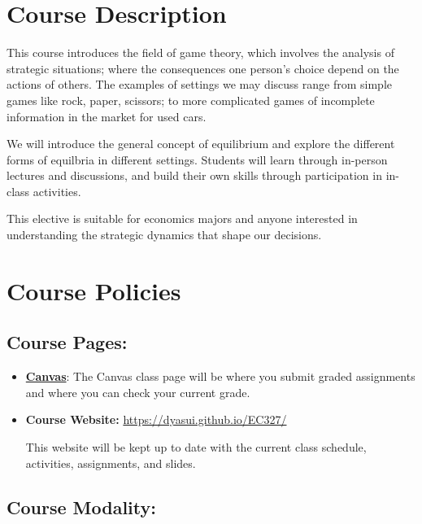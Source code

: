 \section*{Course Description}

This course introduces the field of game theory, which involves the analysis of strategic situations; where the consequences one person's choice depend on the actions of others.
The examples of settings we may discuss range from simple games like rock, paper, scissors; to more complicated games of incomplete information in the market for used cars. 

We will introduce the general concept of equilibrium and explore the different forms of equilbria in different settings.
Students will learn through in-person lectures and discussions,
and build their own skills through participation in in-class activities.

This elective is suitable for economics majors and anyone interested in understanding the strategic dynamics that shape our decisions.

\section{Course Policies}

\subsection{Course Pages:}

\begin{itemize}

\item \href{https://canvas.uoregon.edu/courses/274671}{\textbf{Canvas}}:
  The Canvas class page will be where you submit graded assignments and where you can check your current grade.

\item \textbf{Course Website:} \url{https://dyasui.github.io/EC327/}

  This website will be kept up to date with the current class schedule, activities, assignments, and slides.

\end{itemize}

\subsection{Course Modality:}


